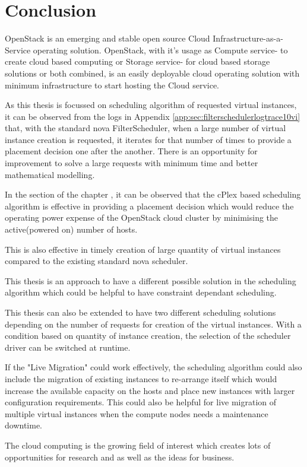 
\chapter{Conclusion}\label{ch:Conclusion}

OpenStack is an emerging and stable open source Cloud Infrastructure-as-a-Service operating solution.
OpenStack, with it's usage as Compute service- to create cloud based computing or Storage service- for cloud based storage solutions or both combined, is an easily deployable cloud operating solution with minimum infrastructure to start hosting the Cloud service.

As this thesis is focussed on scheduling algorithm of requested virtual instances, it can be observed from the logs in Appendix \ref{app:sec:filterschedulerlogtrace10vi} that, with the standard nova FilterScheduler, when a large number of virtual instance creation is requested, it iterates for that number of times to provide a placement decision one after the another. There is an opportunity for improvement to solve a large requests with minimum time and better mathematical modelling.

In the section  of the chapter , it can be observed that the cPlex based scheduling algorithm is effective in providing a placement decision which would reduce the operating power expense of the OpenStack cloud cluster by minimising the active(powered on) number of hosts.

This is also effective in timely creation of large quantity of virtual instances compared to the existing standard nova scheduler.

This thesis is an approach to have a different possible solution in the scheduling algorithm which could be helpful to have constraint dependant scheduling.

This thesis can also be extended to have two different scheduling solutions depending on the number of requests for creation of the virtual instances.
With a condition based on quantity of instance creation, the selection of the scheduler driver can be switched at runtime.

If the "Live Migration" could work effectively, the scheduling algorithm could also include the migration of existing instances to re-arrange itself which would increase the available capacity on the hosts and place new instances with larger configuration requirements.
This could also be helpful for live migration of multiple virtual instances when the compute nodes needs a maintenance downtime.

The cloud computing is the growing field of interest which creates lots of opportunities for research and as well as the ideas for business.
